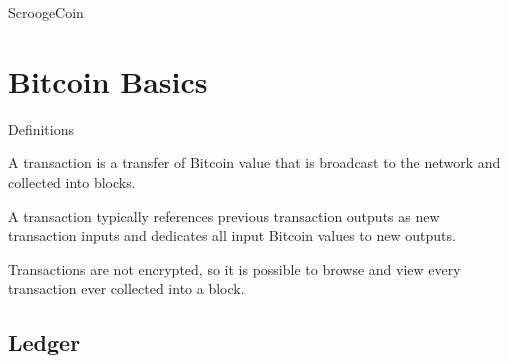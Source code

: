 \begin{frame}{ScroogeCoin}
\end{frame}

\section{Bitcoin Basics}

\begin{frame}{Definitions}
\begin{definition}[Transaction]
	A transaction is a transfer of Bitcoin value that is broadcast to the network and collected into blocks.
\end{definition}

\BI
\item  A transaction typically references previous transaction outputs as new transaction inputs and dedicates all input Bitcoin values to new outputs.
\item Transactions are not encrypted, so it is possible to browse and view every transaction ever collected into a block.
\EI

\end{frame}


\subsection{Ledger}


